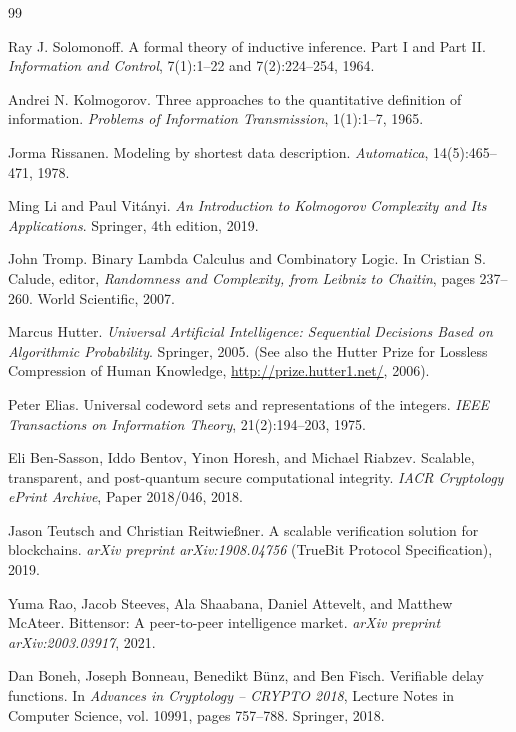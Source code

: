 \documentclass[runningheads,a4paper]{llncs}
\renewcommand{\_}{\textunderscore\allowbreak}
\begin{document}
\newpage
\begin{thebibliography}{99}

Ray J. Solomonoff.
\newblock A formal theory of inductive inference. Part I and Part II.
\newblock \emph{Information and Control}, 7(1):1--22 and 7(2):224--254, 1964.

Andrei N. Kolmogorov.
\newblock Three approaches to the quantitative definition of information.
\newblock \emph{Problems of Information Transmission}, 1(1):1--7, 1965.

Jorma Rissanen.
\newblock Modeling by shortest data description.
\newblock \emph{Automatica}, 14(5):465--471, 1978.

Ming Li and Paul Vit{\'a}nyi.
\newblock \emph{An Introduction to Kolmogorov Complexity and Its Applications}.
\newblock Springer, 4th edition, 2019.

John Tromp.
\newblock Binary Lambda Calculus and Combinatory Logic.
\newblock In Cristian S. Calude, editor, \emph{Randomness and Complexity, from Leibniz to Chaitin}, pages 237--260. World Scientific, 2007.

Marcus Hutter.
\newblock \emph{Universal Artificial Intelligence: Sequential Decisions Based on Algorithmic Probability}.
\newblock Springer, 2005. (See also the Hutter Prize for Lossless Compression of Human Knowledge, \url{http://prize.hutter1.net/}, 2006).

Peter Elias.
\newblock Universal codeword sets and representations of the integers.
\newblock \emph{IEEE Transactions on Information Theory}, 21(2):194--203, 1975.

Eli Ben-Sasson, Iddo Bentov, Yinon Horesh, and Michael Riabzev.
\newblock Scalable, transparent, and post-quantum secure computational integrity.
\newblock \emph{IACR Cryptology ePrint Archive}, Paper 2018/046, 2018.

Jason Teutsch and Christian Reitwie{\ss}ner.
\newblock A scalable verification solution for blockchains.
\newblock \emph{arXiv preprint arXiv:1908.04756} (TrueBit Protocol Specification), 2019.

Yuma Rao, Jacob Steeves, Ala Shaabana, Daniel Attevelt, and Matthew McAteer.
\newblock Bittensor: A peer-to-peer intelligence market.
\newblock \emph{arXiv preprint arXiv:2003.03917}, 2021.

Dan Boneh, Joseph Bonneau, Benedikt B{\"u}nz, and Ben Fisch.
\newblock Verifiable delay functions.
\newblock In \emph{Advances in Cryptology -- CRYPTO 2018}, Lecture Notes in Computer Science, vol. 10991, pages 757--788. Springer, 2018.


\end{thebibliography}
\end{document}
